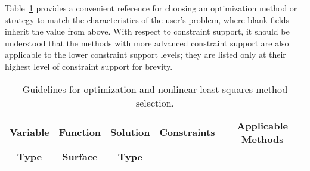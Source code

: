 Table~\ref{usage:guideopt} provides a convenient reference for
choosing an optimization method or strategy to match the
characteristics of the user's problem, where blank fields inherit the
value from above. With respect to constraint support, it should be
understood that the methods with more advanced constraint support are
also applicable to the lower constraint support levels; they are
listed only at their highest level of constraint support for brevity.

\begin{table}
\centering
\caption{Guidelines for optimization and nonlinear least squares method 
selection.}
\label{usage:guideopt}\vspace{2mm}
\begin{tabular}{|c|c|c|c|c|}
\hline
\textbf{Variable} & \textbf{Function} & \textbf{Solution} &
\textbf{Constraints} & \textbf{Applicable Methods} \\
\textbf{Type} & \textbf{Surface} & \textbf{Type} & & \\


\end{tabular}
\end{table}
